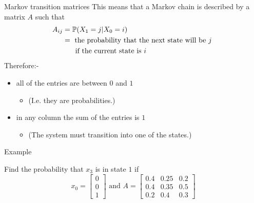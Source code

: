 \documentclass{beamer}
\begin{document}
\begin{frame}{Markov transition matrices}
This means that a Markov chain is described by a matrix $A$ such that
\begin{align*}
A_{ij} &= \mathbb{P}(X_1 = j | X_0 = i)\\
&= \text{ the probability that the next state will be $j$ }\\
&\hspace{0.5cm} \text{ if the current state is $i$}
\end{align*}
Therefore:-
\begin{itemize}
	\item all of the entries are between $0$ and $1$
	\begin{itemize}
		\item (I.e. they are probabilities.)
	\end{itemize}
	\item in any column the sum of the entries is $1$
	\begin{itemize}
		\item (The system must transition into one of the states.)
	\end{itemize}
\end{itemize}
\end{frame}

\begin{frame}{Example}
\begin{example}
	Find the probability that $x_3$ is in state $1$ if
	\begin{equation*}
	x_0 = \left[
	\begin{matrix}
	0\\
	0\\
	1
	\end{matrix}
	\right] \text{ and }
	A = \left[
	\begin{matrix}
	0.4&0.25&0.2\\
	0.4&0.35&0.5\\
	0.2&0.4& 0.3
	\end{matrix}
	\right]
	\end{equation*}
\end{example}
\end{frame}
\end{document}
